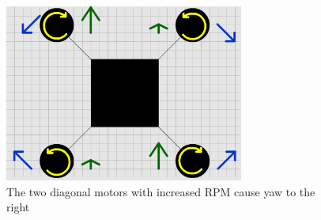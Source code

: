 \begin{enumerate}
\begin{figure}[H]
  \centering
    \includegraphics[width=0.7\textwidth]{images/droneYaw.png}
	\caption{The two diagonal motors with increased RPM cause yaw to the right}
	\label{droneYaw}
\end{figure}
\end{enumerate}